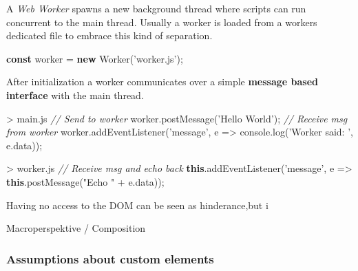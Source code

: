 \documentclass[]{assets/latex/ieee}
\newenvironment{Shaded}{}{}
\newcommand{\KeywordTok}[1]{\textcolor[rgb]{0.00,0.44,0.13}{\textbf{{#1}}}}
\newcommand{\StringTok}[1]{\textcolor[rgb]{0.25,0.44,0.63}{{#1}}}
\newcommand{\CommentTok}[1]{\textcolor[rgb]{0.38,0.63,0.69}{\textit{{#1}}}}
\newcommand{\VariableTok}[1]{\textcolor[rgb]{0.10,0.09,0.49}{{#1}}}
\newcommand{\OperatorTok}[1]{\textcolor[rgb]{0.40,0.40,0.40}{{#1}}}
\newcommand{\AttributeTok}[1]{\textcolor[rgb]{0.49,0.56,0.16}{{#1}}}
\newcommand{\NormalTok}[1]{{#1}}
\begin{document}
A \emph{Web Worker} spawns a new background thread where scripts can run
concurrent to the main thread. Usually a worker is loaded from a workers
dedicated file to embrace this kind of separation.

\begin{Shaded}
\begin{Highlighting}[]
\KeywordTok{const} \NormalTok{worker }\OperatorTok{=} \KeywordTok{new} \AttributeTok{Worker}\NormalTok{(}\StringTok{'worker.js'}\NormalTok{)}\OperatorTok{;}
\end{Highlighting}
\end{Shaded}

After initialization a worker communicates over a simple \textbf{message
based interface} with the main thread.

\begin{Shaded}
\begin{Highlighting}[]
\OperatorTok{>} \VariableTok{main}\NormalTok{.}\AttributeTok{js}
\CommentTok{// Send to worker}
\VariableTok{worker}\NormalTok{.}\AttributeTok{postMessage}\NormalTok{(}\StringTok{'Hello World'}\NormalTok{)}\OperatorTok{;}
\CommentTok{// Receive msg from worker}
\VariableTok{worker}\NormalTok{.}\AttributeTok{addEventListener}\NormalTok{(}\StringTok{'message'}\OperatorTok{,} \NormalTok{e }\OperatorTok{=>}
 \VariableTok{console}\NormalTok{.}\AttributeTok{log}\NormalTok{(}\StringTok{'Worker said: '}\OperatorTok{,} \VariableTok{e}\NormalTok{.}\AttributeTok{data}\NormalTok{))}\OperatorTok{;}
\end{Highlighting}
\end{Shaded}

\begin{Shaded}
\begin{Highlighting}[]
\OperatorTok{>} \VariableTok{worker}\NormalTok{.}\AttributeTok{js}
\CommentTok{// Receive msg and echo back}
\KeywordTok{this}\NormalTok{.}\AttributeTok{addEventListener}\NormalTok{(}\StringTok{'message'}\OperatorTok{,} \NormalTok{e }\OperatorTok{=>}
 \KeywordTok{this}\NormalTok{.}\AttributeTok{postMessage}\NormalTok{(}\StringTok{"Echo "} \OperatorTok{+} \VariableTok{e}\NormalTok{.}\AttributeTok{data}\NormalTok{))}\OperatorTok{;}
\end{Highlighting}
\end{Shaded}

Having no access to the DOM can be seen as hinderance,but i

Macroperspektive / Composition

\subsubsection{Assumptions about custom
elements}\label{assumptions-about-custom-elements}
\end{document}
